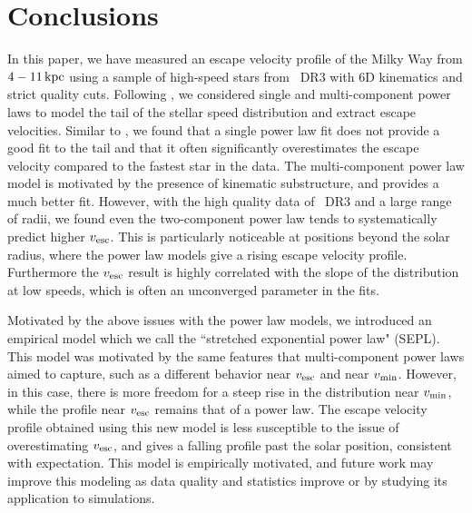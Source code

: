 \section{Conclusions}
In this paper, we have measured an escape velocity profile of the Milky Way from $4-11\,\rm{kpc}$ using a sample of high-speed stars from \Gaia~DR3 with 6D kinematics and strict quality cuts. Following \cite{Necib2022methods}, we considered single and multi-component power laws to model the tail of the stellar speed distribution and extract escape velocities. Similar to \cite{Necib2022}, we found that a single power law fit does not provide a good fit to the tail and that it often significantly overestimates the escape velocity compared to the fastest star in the data. The multi-component power law model is motivated by the presence of kinematic substructure, and provides a much better fit. However, with the high quality data of \Gaia~DR3 and a large range of radii, we found even the two-component power law tends to systematically predict higher $v_{\rm{esc}}$. This is particularly noticeable at positions beyond the solar radius, where the power law models give a rising escape velocity profile. Furthermore the $v_{\rm{esc}}$ result is highly correlated with the slope of the distribution at low speeds, which is often an unconverged parameter in the fits.

Motivated by the above issues with the power law models, we introduced an empirical model which we call the ``stretched exponential power law" (SEPL). This model was motivated by the same features that multi-component power laws aimed to capture, such as a different behavior near $v_{\rm{esc}}$ and near $v_{\rm{min}}$. However, in this case, there is more freedom for a steep rise in the distribution near $v_{\rm{min}}$, while the profile near $v_{\rm{esc}}$ remains that of a power law. The escape velocity profile obtained using this new model is less susceptible to the issue of overestimating $v_{\rm{esc}}$, and gives a falling profile past the solar position, consistent with expectation. This model is empirically motivated, and future work may improve this modeling as data quality and statistics improve or by studying its application to simulations.

